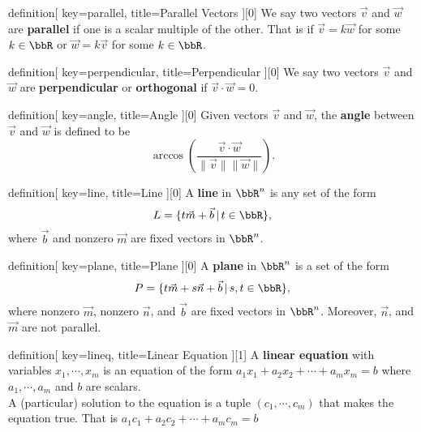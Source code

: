 \begin{SaveConcept}{definition}[
		key=parallel,
		title={Parallel Vectors}
	][0]
        We say two vectors $\vec v $ and $\vec w$ are \textbf{parallel} if one is a scalar multiple of the other. That is if $\vec v=k \vec w$ for some $k\in \bbR$ or $\vec w=k\vec v$ for some $k\in \bbR$.
\end{SaveConcept}


\begin{SaveConcept}{definition}[
		key=perpendicular,
		title={Perpendicular}
	][0]
        We say two vectors $\vec v $ and $\vec w$ are \textbf{perpendicular} or\textbf{ orthogonal }if $\vec v\cdot\vec w=0$. 
\end{SaveConcept}


\begin{SaveConcept}{definition}[
		key=angle,
		title={Angle}
	][0]
        Given vectors $\vec v$ and $\vec w$, the \textbf{angle} between $\vec v$ and $\vec w$ is defined to be
  	$$
        \arccos\left(\frac{\vec v\cdot\vec w}{\|\vec v\|\|\vec w\|}\right).
  	$$
\end{SaveConcept}


\begin{SaveConcept}{definition}[
		key=line,
		title={Line}
	][0]
        A {\bf line} in  $\bbR^n$ is any set of the form
        $$
        L = \{ t \vec m + \vec b \,|\, t \in \bbR\},
        $$
        where $\vec b$ and nonzero $\vec m$  are fixed vectors in   $\bbR^n$.
\end{SaveConcept}





\begin{SaveConcept}{definition}[
		key=plane,
		title={Plane}
	][0]
        A {\bf plane} in  $\bbR^n$ is a set of the form
        $$
        P = \{ t \vec m + s \vec n + \vec b \,|\, s, t \in \bbR\},
        $$
        where nonzero $\vec m$, nonzero $\vec n$, and $\vec b$ are fixed vectors in   $\bbR^n$. Moreover, $\vec n$, and $\vec m$ are not parallel. 
\end{SaveConcept}





\begin{SaveConcept}{definition}[
		key=lineq,
		title={Linear Equation}
	][1]
        A \textbf{linear equation} with variables $x_1,\cdots, x_m$ is an equation of the form $a_{1}x_{1}+a_{2}x_{2}+\cdots+ a_{m}x_{m}=b$ where $a_1,\cdots, a_m$ and $b$ are scalars. \\A (particular) solution to the equation is a tuple $(c_1,\cdots,c_m)$ that makes the equation true. That is $a_{1}c_{1}+a_{2}c_{2}+\cdots+ a_{m}c_{m}=b$ 
\end{SaveConcept}



